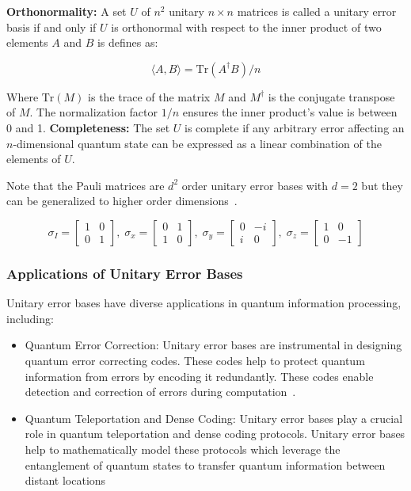\begin{definition}
\textbf{Orthonormality:} A set $U$ of $n^2$ unitary $n \times n$ matrices is called a unitary error basis if and only if $U$ is orthonormal with respect to the inner product of two elements $A$ and $B$ is defines as:

$$\langle A, B \rangle = {\textrm{Tr}(A^\dagger B)} / n$$

Where $\textrm{Tr}(M)$ is the trace of the matrix $M$ and $M^\dagger$ is the conjugate transpose of $M$. The normalization factor $1/n$ ensures the inner product's value is between 0 and 1.
\textbf{Completeness:} The set $U$ is complete if any arbitrary error affecting an $n$-dimensional quantum state can be expressed as a linear combination of the elements of $U$. 
\end{definition}

Note that the Pauli matrices are $d^2$ order unitary error bases with $d=2$ but they can be generalized to higher order dimensions~\cite{klappenecker2003UnitaryErrorBases}.

{\small
\begin{equation*}
    \sigma_I = \begin{bmatrix} 1 & 0  \\ 0 & 1  \end{bmatrix}, \;
    \sigma_x = \begin{bmatrix} 0 & 1  \\ 1 & 0  \end{bmatrix}, \;
    \sigma_y = \begin{bmatrix} 0 & -i \\ i & 0  \end{bmatrix}, \;
    \sigma_z = \begin{bmatrix} 1 & 0  \\ 0 & -1 \end{bmatrix}
\end{equation*}
}

\subsubsection{Applications of Unitary Error Bases} 
Unitary error bases have diverse applications in quantum information processing, including:
\begin{itemize}
  \item Quantum Error Correction: Unitary error bases are instrumental in designing quantum error correcting codes. These codes help to protect quantum information from errors by encoding it redundantly. These codes enable detection and correction of errors during computation~\cite{knill1996ConcatenatedQuantumCodes}.
  \item Quantum Teleportation and Dense Coding: Unitary error bases play a crucial role in quantum teleportation and dense coding protocols. Unitary error bases help to mathematically model these protocols which leverage the entanglement of quantum states to transfer quantum information between distant locations~\cite{klappenecker2003UnitaryErrorBases}
\end{itemize}

